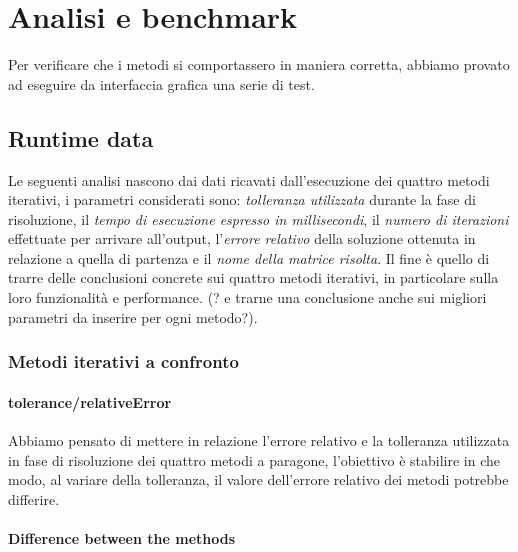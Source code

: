 \section{Analisi e benchmark}

Per verificare che i metodi si comportassero in maniera corretta, abbiamo provato ad eseguire da interfaccia grafica una serie di test.




\subsection{Runtime data}

Le seguenti analisi nascono dai dati ricavati dall'esecuzione dei quattro metodi iterativi, i parametri considerati sono: \textit{tolleranza utilizzata} durante la fase di risoluzione, il \textit{tempo di esecuzione espresso in millisecondi}, il \textit{numero di iterazioni} effettuate per arrivare all'output, l'\textit{errore relativo} della soluzione ottenuta in relazione a quella di partenza e il \textit{nome della matrice risolta}. Il fine è quello di trarre delle conclusioni concrete sui quattro metodi iterativi, in particolare sulla loro funzionalità e performance.
(? e trarne una conclusione anche sui migliori parametri da inserire per ogni metodo?).


\subsubsection{Metodi iterativi a confronto}

\paragraph{tolerance/relativeError}
Abbiamo pensato di mettere in relazione l'errore relativo e la tolleranza utilizzata in fase di risoluzione dei quattro metodi a paragone, l'obiettivo è stabilire in che modo, al variare della tolleranza, il valore dell'errore relativo dei metodi potrebbe differire.

\paragraph{Difference between the methods}

